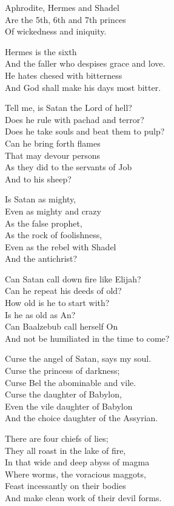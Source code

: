 \documentclass[
]{book}
\begin{document}
Aphrodite, Hermes and Shadel\\
Are the 5th, 6th and 7th princes\\
Of wickedness and iniquity.

Hermes is the sixth\\
And the faller who despises grace and love.\\
He hates chesed with bitterness\\
And God shall make his days most bitter.

Tell me, is Satan the Lord of hell?\\
Does he rule with pachad and terror?\\
Does he take souls and beat them to pulp?\\
Can he bring forth flames\\
That may devour persons\\
As they did to the servants of Job\\
And to his sheep?

Is Satan as mighty,\\
Even as mighty and crazy\\
As the false prophet,\\
As the rock of foolishness,\\
Even as the rebel with Shadel\\
And the antichrist?

Can Satan call down fire like Elijah?\\
Can he repeat his deeds of old?\\
How old is he to start with?\\
Is he as old as An?\\
Can Baalzebub call herself On\\
And not be humiliated in the time to come?

Curse the angel of Satan, says my soul.\\
Curse the princess of darkness;\\
Curse Bel the abominable and vile.\\
Curse the daughter of Babylon,\\
Even the vile daughter of Babylon\\
And the choice daughter of the Assyrian.

There are four chiefs of lies;\\
They all roast in the lake of fire,\\
In that wide and deep abyss of magma\\
Where worms, the voracious maggots,\\
Feast incessantly on their bodies\\
And make clean work of their devil forms.
\end{document}
